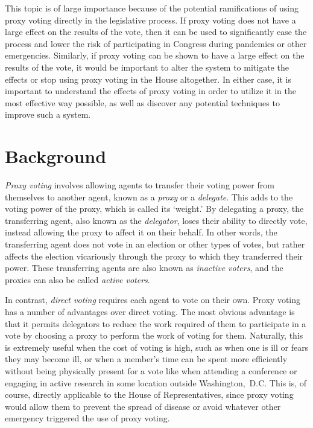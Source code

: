 This topic is of large importance because of the potential ramifications of using
proxy voting directly in the legislative process.
If proxy voting does not have a large effect on the results of the vote, then it
can be used to significantly ease the process and lower the risk of participating in
Congress during pandemics or other emergencies.
Similarly, if proxy voting can be shown to have a large effect on the results of the
vote, it would be important to alter the system to mitigate the effects or stop using
proxy voting in the House altogether.
In either case, it is important to understand the effects of proxy voting in order to
utilize it in the most effective way possible, as well as discover any potential
techniques to improve such a system.


\section{Background}\label{sec:background}
\textit{Proxy voting} involves allowing agents to transfer their voting power
from themselves to another agent, known as a \textit{proxy} or a \textit{delegate}.
This adds to the voting power of the proxy, which is called its `weight.'
By delegating a proxy, the transferring agent, also known as the \textit{delegator},
loses their ability to directly vote, instead allowing the proxy to affect it on
their behalf.
In other words, the transferring agent does not vote in an election or other types of
votes, but rather affects the election vicariously through the proxy to which they
transferred their power.
These transferring agents are also known as \textit{inactive voters}, and the proxies
can also be called \textit{active voters}.

In contrast, \textit{direct voting} requires each agent to vote on their own.
Proxy voting has a number of advantages over direct voting.
The most obvious advantage is that it permits delegators to reduce the work
required of them to participate in a vote by choosing a proxy to perform the work of
voting for them.
Naturally, this is extremely useful when the cost of voting is high, such as
when one is ill or fears they may become ill, or when a member's time can be spent
more efficiently without being physically present for a vote like when attending a
conference or engaging in active research in some location outside {Washington,~D.C}.
This is, of course, directly applicable to the House of Representatives, since proxy
voting would allow them to prevent the spread of disease or avoid whatever other
emergency triggered the use of proxy voting.

